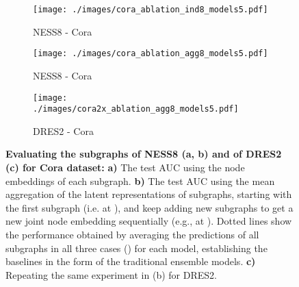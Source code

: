 \documentclass{article}
\begin{document}
\begin{figure}[t]
\vskip 0.2in
\begin{center}
     \begin{subfigure}[c]{0.33\columnwidth}
        \texttt{[image: ./images/cora\_ablation\_ind8\_models5.pdf]}
         \caption{NESS8 - Cora}
     \end{subfigure}
     \begin{subfigure}[c]{0.31\columnwidth}
        \texttt{[image: ./images/cora\_ablation\_agg8\_models5.pdf]}
         \caption{NESS8 - Cora}
     \end{subfigure}
     \begin{subfigure}[c]{0.32\columnwidth}
        \texttt{[image: ./images/cora2x\_ablation\_agg8\_models5.pdf]}
         \caption{DRES2 - Cora}
     \end{subfigure}
\caption{\textbf{Evaluating the subgraphs of NESS8 (a, b) and of DRES2 (c) for Cora dataset:} \textbf{a)} The test AUC using the node embeddings of each subgraph. \textbf{b)} The test AUC using the mean aggregation of the latent representations of subgraphs, starting with the first subgraph (i.e.  at ), and keep adding new subgraphs to get a new joint node embedding sequentially (e.g.,  at ). Dotted lines show the performance obtained by averaging the predictions of all subgraphs in all three cases () for each model, establishing the baselines in the form of the traditional ensemble models. \textbf{c)} Repeating the same experiment in (b) for DRES2.}\label{fig:gradual_aggregation_performance}
\end{center}
\vskip -0.2in
\end{figure}
\end{document}
